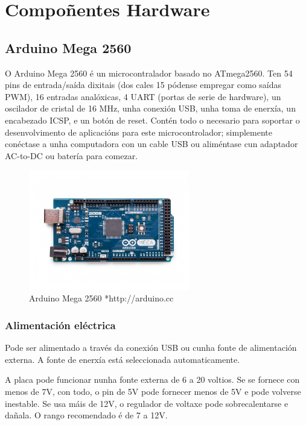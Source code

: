 \documentclass[11pt,twoside]{book}
\begin{document}
\chapter{Compoñentes Hardware}
\section{Arduino Mega 2560}

O Arduino Mega 2560 é un microcontralador basado no ATmega2560. Ten 54 pins de entrada/saída dixitais (dos cales 15 pódense empregar como saídas PWM), 16 entradas analóxicas, 4 UART (portas de serie de hardware), un oscilador de cristal de 16 MHz, unha conexión USB, unha toma de enerxía, un encabezado ICSP, e un botón de reset. Contén todo o necesario para soportar o desenvolvimento de aplicacións para este microcontrolador; simplemente conéctase a unha computadora con un cable USB ou aliméntase cun adaptador AC-to-DC ou batería para comezar. 

\begin{figure}[H]
	\begin{center}
		\includegraphics[width=7cm]{images/arduino_mega.jpg}
	\end{center}
	\caption{Arduino Mega 2560 *http://arduino.cc}
	\label{fig:ArduinoMega}
\end{figure}

\subsection{Alimentación eléctrica}

Pode ser alimentado a través da conexión USB ou cunha fonte de alimentación externa. A fonte de enerxía está seleccionada automaticamente. 

A placa pode funcionar nunha fonte externa de 6 a 20 voltios. Se se fornece con menos de 7V, con todo, o pin de 5V pode fornecer menos de 5V e pode volverse inestable. Se usa máis de 12V, o regulador de voltaxe pode sobrecalentarse e dañala. O rango recomendado é de 7 a 12V.
\end{document}
